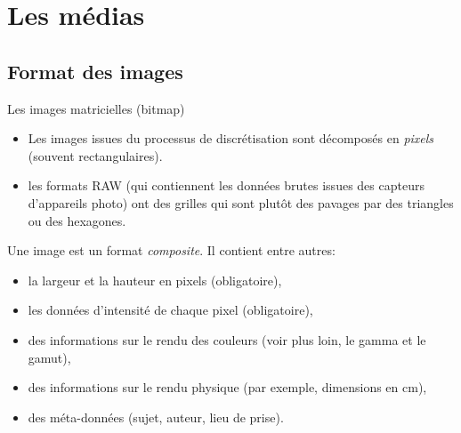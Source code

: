 \section{Les médias}
\subsection{Format des images}
\begin{frame}{Les images matricielles (bitmap)}
  \begin{itemize}
  \item[\dialoginformation] Les images issues du processus de discrétisation
    sont décomposés en \emph{pixels} (souvent rectangulaires).
  \item[\ddialogwarning] les formats RAW (qui contiennent les données brutes
    issues des capteurs d'appareils photo) ont des grilles qui sont plutôt des
    pavages par des triangles ou des hexagones.
  \end{itemize}
  Une image est un format \emph{composite}. Il contient entre autres:
  \begin{itemize}
  \item la largeur et la hauteur en pixels (obligatoire),
  \item les données d'intensité de chaque pixel (obligatoire),
  \item des informations sur le rendu des couleurs (voir plus loin, le gamma
    et le gamut),
  \item des informations sur le rendu physique (par exemple, dimensions en
    cm),
  \item des méta-données (sujet, auteur, lieu de prise).
  \end{itemize}
\end{frame}
